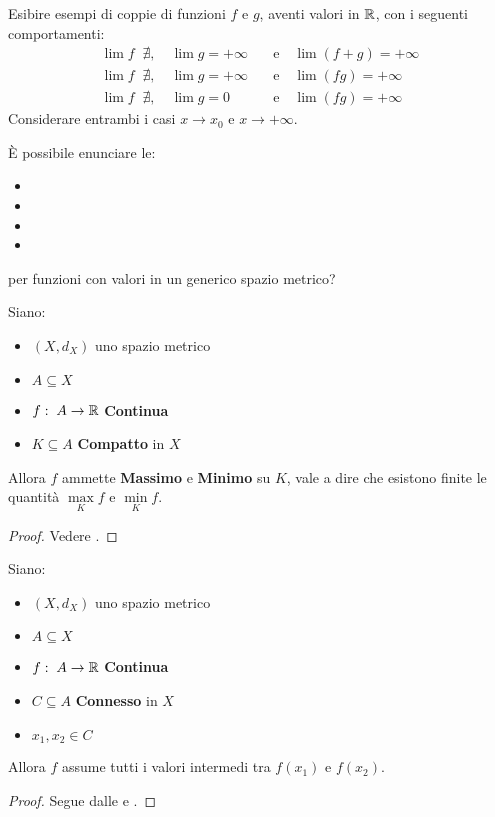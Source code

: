 \begin{exercise}
	Esibire esempi di coppie di funzioni $f$ e $g$, aventi valori in $\mathbb{R}$, con i seguenti comportamenti:
	\begin{align*}
		\lim f \;\; \nexists, \quad \lim g = +\infty \quad &\text{e} \quad \lim (f + g) = +\infty\\
		\lim f \;\; \nexists, \quad \lim g = +\infty \quad &\text{e} \quad \lim (fg) = +\infty\\
		\lim f \;\; \nexists, \quad \lim g = 0 \quad &\text{e} \quad \lim (fg) = +\infty
	\end{align*}
	Considerare entrambi i casi $x \to x_0$ e $x \to +\infty$.
\end{exercise}
\begin{exercise}
	È possibile enunciare le:
	\begin{itemize}[noitemsep]
		\item {}
		\item {}
		\item {}
		\item {}
	\end{itemize}
	per funzioni con valori in un generico spazio metrico?
\end{exercise}
\begin{corollary}
	\label{coro:weierstrass_analisi_1}
	Siano:
	\begin{itemize}[noitemsep]
		\item $(X,d_X)$ uno spazio metrico
		\item $A \subseteq X$
		\item $f:\; A \to \mathbb{R}$ \textbf{Continua}
		\item $K \subseteq A$ \textbf{Compatto} in $X$
	\end{itemize}
	Allora $f$ ammette \textbf{Massimo} e \textbf{Minimo} su $K$, vale a dire che esistono finite le quantità $\max\limits_{K} f$ e $\min\limits_{K} f$.
	\begin{proof}
		Vedere .
	\end{proof}
\end{corollary}
\begin{corollary}
	Siano:
	\begin{itemize}[noitemsep]
		\item $(X,d_X)$ uno spazio metrico
		\item $A \subseteq X$
		\item $f:\; A \to \mathbb{R}$ \textbf{Continua}
		\item $C \subseteq A$ \textbf{Connesso} in $X$
		\item $x_1, x_2 \in C$
	\end{itemize}
	Allora $f$ assume tutti i valori intermedi tra $f(x_1)$ e $f(x_2)$.
	\begin{proof}
		Segue dalle  e .
	\end{proof}
\end{corollary}
